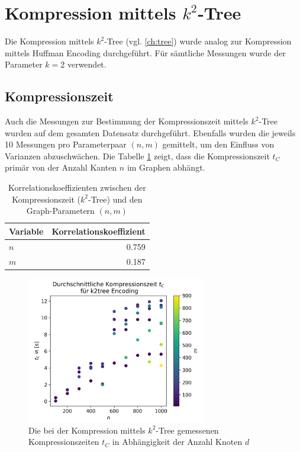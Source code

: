 \documentclass{ffhsthesis}
\begin{document}
\section{Kompression mittels $k^{2}$-Tree}
Die Kompression mittels $k^{2}$-Tree (vgl. \ref{ch:tree}) wurde analog zur Kompression mittels Huffman Encoding durchgeführt. Für sämtliche Messungen wurde der Parameter $k=2$ verwendet.
\subsection{Kompressionszeit}
Auch die Messungen zur Bestimmung der Kompressionszeit mittels $k^2$-Tree wurden auf dem gesamten Datensatz durchgeführt. Ebenfalls wurden die jeweils 10 Messungen pro Parameterpaar $(n,m)$ gemittelt, um den Einfluss von Varianzen abzuschwächen. Die Tabelle \ref{tab:coefficientstree} zeigt, dass die Kompressionszeit $t_{C}$ primär von der Anzahl Kanten $n$ im Graphen abhängt.
\begin{table}[h]
\centering
\begin{tabular}{@{}lr@{}}
\toprule
Variable    & Korrelationskoeffizient \\
\midrule
$n$ & 0.759 \\
$m$ & 0.187 \\
\bottomrule
\end{tabular}
\caption{Korrelationskoeffizienten zwischen der Kompressionszeit ($k^{2}$-Tree) und den Graph-Parametern $(n,m)$}
\label{tab:coefficientstree}
\end{table}

\begin{figure}[H]
    \centering
    \includegraphics[width=0.7\textwidth]{images/average_k2tree_time_2d_filtered.png}
    \caption{Die bei der Kompression mittels $k^{2}$-Tree gemessenen Kompressionszeiten $t_{C}$ in Abhängigkeit der Anzahl Knoten $d$}
    \label{fig:compression_time_k2}
\end{figure}
\end{document}

